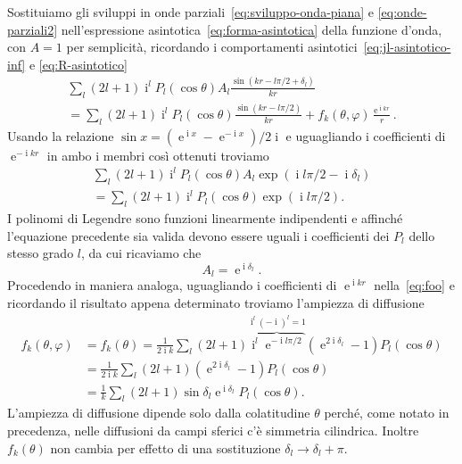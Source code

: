 \documentclass[a4paper,fleqn,twoside,12pt]{article}
\renewcommand{\phi}{\varphi}
\DeclareMathOperator{\e}{\mathrm{e}} %
\DeclareMathOperator{\uimm}{\mathrm{i}} %
\begin{document}
Sostituiamo gli sviluppi in onde parziali~\eqref{eq:sviluppo-onda-piana} e
\eqref{eq:onde-parziali2} nell'espressione
asintotica~\eqref{eq:forma-asintotica} della funzione d'onda, con $A = 1$ per
semplicità, ricordando i comportamenti asintotici~\eqref{eq:jl-asintotico-inf} e
\eqref{eq:R-asintotico}
\begin{multline}
  \label{eq:foo}
  \sum_{l}(2l+1)\uimm^{l}P_{l}(\cos\theta)A_{l}\frac{\sin(kr - l\pi/2 +
    \delta_{l})}{kr} \\
  = \sum_{l}(2l+1)\uimm^{l} P_{l}(\cos\theta)\frac{\sin(kr - l\pi/2)}{kr} +
  f_{k}(\theta,\phi)\frac{\e^{\uimm kr}}{r}.
\end{multline}
Usando la relazione $\sin x = (\e^{\uimm x} - \e^{-\uimm x})/2\uimm$ e
uguagliando i coefficienti di $\e^{-\uimm kr}$ in ambo i membri così ottenuti
troviamo
\begin{multline}
  \sum_{l}(2l+1)\uimm^{l}P_{l}(\cos\theta)A_{l}\exp(\uimm l\pi/2 -
  \uimm\delta_{l}) \\
  = \sum_{l}(2l+1)\uimm^{l}P_{l}(\cos\theta)\exp(\uimm l\pi/2).
\end{multline}
I polinomi di Legendre sono funzioni linearmente indipendenti e affinché
l'equazione precedente sia valida devono essere uguali i coefficienti dei
$P_{l}$ dello stesso grado $l$, da cui ricaviamo che
\begin{equation}
  A_{l} = \e^{\uimm \delta_{l}}.
\end{equation}
Procedendo in maniera analoga, uguagliando i coefficienti di $\e^{\uimm kr}$
nella~\eqref{eq:foo} e ricordando il risultato appena determinato troviamo
l'ampiezza di diffusione
\begin{equation}
  \label{eq:ampiezza-diffusione-op}
  \begin{split}
    f_{k}(\theta,\phi) &= f_{k}(\theta) = \frac{1}{2\uimm k}\sum_{l}(2l+1)
    \overbrace{\uimm^{l}\e^{-\uimm l\pi/2}}^{\uimm^{l}(-\uimm)^{l}=1}
    (\e^{2\uimm\delta_{l}} - 1)P_{l}(\cos\theta) \\
    &= \frac{1}{2\uimm k}\sum_{l}(2l+1)(\e^{2\uimm\delta_{l}} - 1)
    P_{l}(\cos\theta) \\
    &= \frac{1}{k} \sum_{l} (2l+1) \sin\delta_{l} \e^{\uimm\delta_{l}}
    P_{l}(\cos\theta).
  \end{split}
\end{equation}
L'ampiezza di diffusione dipende solo dalla colatitudine $\theta$ perché, come
notato in precedenza, nelle diffusioni da campi sferici c'è simmetria
cilindrica.  Inoltre $f_{k}(\theta)$ non cambia per effetto di una sostituzione
$\delta_{l} \to \delta_{l} + \pi$.
\end{document}
